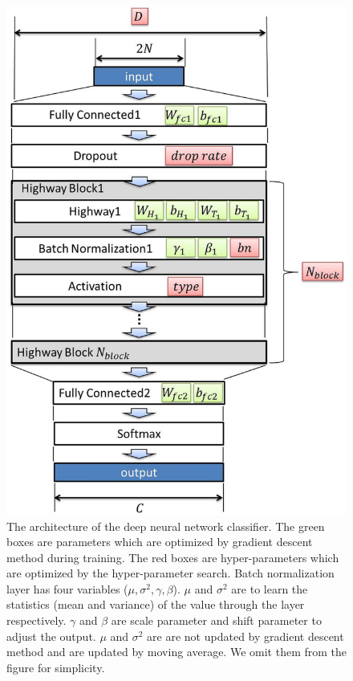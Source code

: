 \documentclass[useamsfonts]{pasj01}
\begin{document}
\begin{figure}[htbp]
  \begin{center}
     \includegraphics[width=\columnwidth]{figures/model_all.eps}
  \end{center}
  \caption{\label{dnnmodel}
  The architecture of the deep neural network classifier. 
  The green boxes are parameters which are optimized by gradient descent method during training. The red boxes are hyper-parameters which are optimized by the hyper-parameter search. 
  Batch normalization layer has four variables ($\mu, \sigma^2, \gamma, \beta$). $\mu$ and $\sigma^2$ are to learn the statistics (mean and variance) of the value through the layer respectively.  $\gamma$ and $\beta$ are scale parameter and shift parameter to adjust the output. $\mu$ and $\sigma^2$ are are not updated by gradient descent method and are updated by moving average. We omit them from the figure for simplicity.
  }%
  \label{fig:dnn_model}
\end{figure}
%
\end{document}
